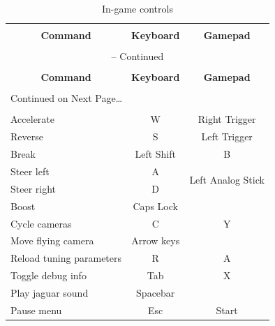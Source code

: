 \documentclass[11pt]{article}
\begin{document}
\begin{center}
\begin{longtable}{lcc}
\caption{In-game controls} \label{ingame-controls-table} \\

\hline \hline \\[-2ex]
   \multicolumn{1}{c}{\textbf{Command}} &
   \multicolumn{1}{c}{\textbf{Keyboard}} &
   \multicolumn{1}{c}{\textbf{Gamepad}} \\[0.5ex] \hline
   \\[-1.8ex]
\endfirsthead

\multicolumn{3}{c}{{\tablename} \thetable{} -- Continued} \\[0.5ex]
  \hline \hline \\[-2ex]
  \multicolumn{1}{c}{\textbf{Command}} &
  \multicolumn{1}{c}{\textbf{Keyboard}} &
  \multicolumn{1}{c}{\textbf{Gamepad}} \\[0.5ex] \hline
  \\[-1.8ex]
\endhead

  \multicolumn{3}{l}{{Continued on Next Page\ldots}} \\
\endfoot

  \\[-1.8ex] \hline \hline
\endlastfoot

Accelerate & W & Right Trigger \\ 
Reverse & S & Left Trigger \\
Break & Left Shift & B \\ 
Steer left & A & \multirow{2}{*}{Left Analog Stick} \\ 
Steer right & D \\
Boost & Caps Lock & \\
Cycle cameras & C & Y \\
Move flying camera & Arrow keys &  \\
Reload tuning parameters & R & A \\
Toggle debug info & Tab & X \\
Play jaguar sound & Spacebar &  \\
Pause menu & Esc & Start \\
\end{longtable}
\end{center}
\end{document}

